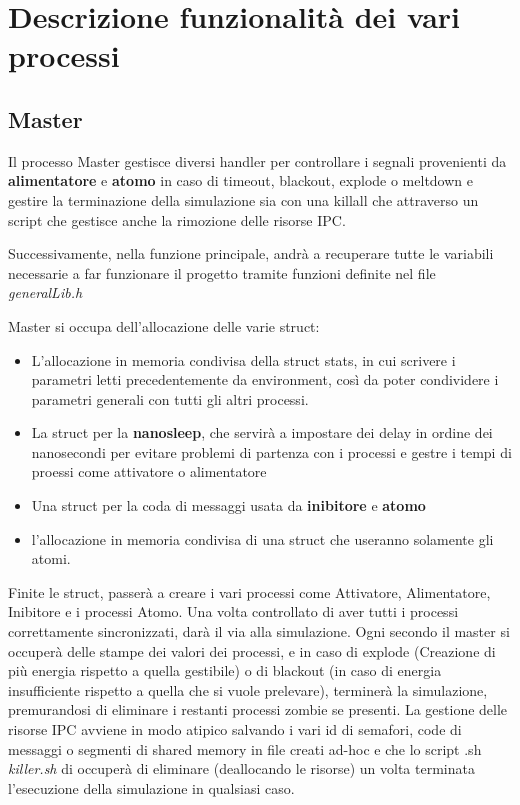 \documentclass{article}
\begin{document}
\section{Descrizione funzionalità dei vari processi}

\subsection{Master}

Il processo Master gestisce diversi handler per controllare i segnali provenienti da \textbf{alimentatore} e \textbf{atomo} in caso di timeout, blackout, explode o meltdown e gestire la terminazione della simulazione sia con una killall che attraverso un script che gestisce anche la rimozione delle risorse IPC.

Successivamente, nella funzione principale, andrà a recuperare tutte le variabili necessarie a far funzionare il progetto tramite funzioni definite nel file \textit{generalLib.h} 

Master si occupa dell'allocazione delle varie struct:
\begin{itemize}
\item L'allocazione in memoria condivisa della struct stats, in cui scrivere i parametri letti precedentemente da environment, così da poter condividere i parametri generali con tutti gli altri processi.
\item La struct per la \textbf{nanosleep}, che servirà a impostare dei delay in ordine dei nanosecondi per evitare problemi di partenza con i processi e gestre i tempi di proessi come attivatore o alimentatore
\item Una struct per la coda di messaggi usata da \textbf{inibitore} e \textbf{atomo}
\item l'allocazione in memoria condivisa di una struct che useranno solamente gli atomi.
\end{itemize}

Finite le struct, passerà a creare i vari processi come Attivatore, Alimentatore, Inibitore e i processi Atomo. Una volta controllato di aver tutti i processi correttamente sincronizzati, darà il via alla simulazione. Ogni secondo il master si occuperà delle stampe dei valori dei processi, e in caso di explode (Creazione di più energia rispetto a quella gestibile) o di blackout (in caso di energia insufficiente rispetto a quella che si vuole prelevare), terminerà la simulazione, premurandosi di eliminare i restanti processi zombie se presenti.
La gestione delle risorse IPC avviene in modo atipico salvando i vari id di semafori, code di messaggi o segmenti di shared memory in file creati ad-hoc e che lo script .sh \textit{killer.sh} di occuperà di eliminare (deallocando le risorse) un volta terminata l'esecuzione della simulazione in qualsiasi caso.
\end{document}
